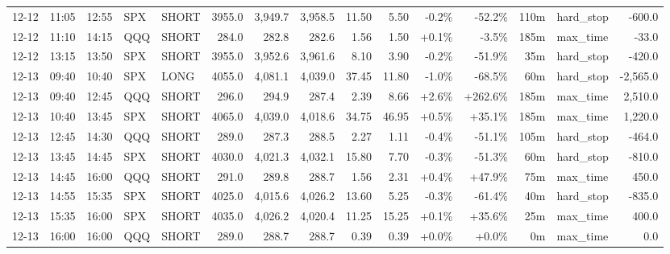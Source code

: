 \documentclass[11pt,a4paper,twoside]{article}
\begin{document}
\begin{landscape}
\begin{center}
\begin{longtable}{>{\color{txtmain}}l l l l l r r r r r r r r >{\color{txtmain}}l r}
12-12 & 11:05 & 12:55 & SPX & SHORT & 3955.0 & 3,949.7 & 3,958.5 & 11.50 & 5.50 & \textcolor{lossred}{-0.2\%} & \textcolor{lossred}{-52.2\%} & 110m & hard\_stop & \textcolor{lossred}{-600.0} \\
12-12 & 11:10 & 14:15 & QQQ & SHORT & 284.0 & 282.8 & 282.6 & 1.56 & 1.50 & \textcolor{wingreen}{+0.1\%} & \textcolor{lossred}{-3.5\%} & 185m & max\_time & \textcolor{lossred}{-33.0} \\
12-12 & 13:15 & 13:50 & SPX & SHORT & 3955.0 & 3,952.6 & 3,961.6 & 8.10 & 3.90 & \textcolor{lossred}{-0.2\%} & \textcolor{lossred}{-51.9\%} & 35m & hard\_stop & \textcolor{lossred}{-420.0} \\
12-13 & 09:40 & 10:40 & SPX & LONG & 4055.0 & 4,081.1 & 4,039.0 & 37.45 & 11.80 & \textcolor{lossred}{-1.0\%} & \textcolor{lossred}{-68.5\%} & 60m & hard\_stop & \textcolor{lossred}{-2,565.0} \\
12-13 & 09:40 & 12:45 & QQQ & SHORT & 296.0 & 294.9 & 287.4 & 2.39 & 8.66 & \textcolor{wingreen}{+2.6\%} & \textcolor{wingreen}{+262.6\%} & 185m & max\_time & \textcolor{wingreen}{2,510.0} \\
12-13 & 10:40 & 13:45 & SPX & SHORT & 4065.0 & 4,039.0 & 4,018.6 & 34.75 & 46.95 & \textcolor{wingreen}{+0.5\%} & \textcolor{wingreen}{+35.1\%} & 185m & max\_time & \textcolor{wingreen}{1,220.0} \\
12-13 & 12:45 & 14:30 & QQQ & SHORT & 289.0 & 287.3 & 288.5 & 2.27 & 1.11 & \textcolor{lossred}{-0.4\%} & \textcolor{lossred}{-51.1\%} & 105m & hard\_stop & \textcolor{lossred}{-464.0} \\
12-13 & 13:45 & 14:45 & SPX & SHORT & 4030.0 & 4,021.3 & 4,032.1 & 15.80 & 7.70 & \textcolor{lossred}{-0.3\%} & \textcolor{lossred}{-51.3\%} & 60m & hard\_stop & \textcolor{lossred}{-810.0} \\
12-13 & 14:45 & 16:00 & QQQ & SHORT & 291.0 & 289.8 & 288.7 & 1.56 & 2.31 & \textcolor{wingreen}{+0.4\%} & \textcolor{wingreen}{+47.9\%} & 75m & max\_time & \textcolor{wingreen}{450.0} \\
12-13 & 14:55 & 15:35 & SPX & SHORT & 4025.0 & 4,015.6 & 4,026.2 & 13.60 & 5.25 & \textcolor{lossred}{-0.3\%} & \textcolor{lossred}{-61.4\%} & 40m & hard\_stop & \textcolor{lossred}{-835.0} \\
12-13 & 15:35 & 16:00 & SPX & SHORT & 4035.0 & 4,026.2 & 4,020.4 & 11.25 & 15.25 & \textcolor{wingreen}{+0.1\%} & \textcolor{wingreen}{+35.6\%} & 25m & max\_time & \textcolor{wingreen}{400.0} \\
12-13 & 16:00 & 16:00 & QQQ & SHORT & 289.0 & 288.7 & 288.7 & 0.39 & 0.39 & \textcolor{wingreen}{+0.0\%} & \textcolor{wingreen}{+0.0\%} & 0m & max\_time & \textcolor{wingreen}{0.0} \\

\end{longtable}
\end{center}
\end{landscape}
\end{document}
